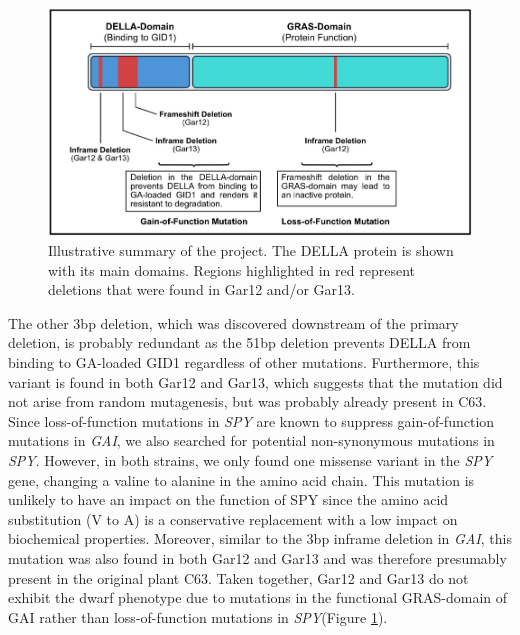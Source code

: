 \documentclass[10pt,a4paper]{article}
\begin{document}
\begin{figure}[H]
	\centering
	\includegraphics[width=0.7\linewidth]{img/DELLAdomains}
	\caption{Illustrative summary of the project. The DELLA protein is shown with its main domains. Regions highlighted in red represent deletions that were found in Gar12 and/or Gar13.}
	\label{fig:delladomains}
\end{figure}



\noindent The other 3bp deletion, which was discovered downstream of the primary deletion, is probably redundant as the 51bp deletion prevents DELLA from binding to GA-loaded GID1 regardless of other mutations. Furthermore, this variant is found in both Gar12 and Gar13, which suggests that the mutation did not arise from random mutagenesis, but was probably already present in C63. Since loss-of-function mutations in \textit{SPY} are known to suppress gain-of-function mutations in \textit{GAI}, we also searched for potential non-synonymous mutations in \textit{SPY}. However, in both strains, we only found one missense variant in the \textit{SPY} gene, changing a valine to alanine in the amino acid chain. This mutation is unlikely to have an impact on the function of SPY since the amino acid substitution (V to A) is a conservative replacement with a low impact on biochemical properties. Moreover, similar to the 3bp inframe deletion in \textit{GAI}, this mutation was also found in both Gar12 and Gar13 and was therefore presumably present in the original plant C63. Taken together, Gar12 and Gar13 do not exhibit the dwarf phenotype due to mutations in the functional GRAS-domain of GAI rather than loss-of-function mutations in \textit{SPY}(Figure \ref{fig:delladomains}).





\newpage
\end{document}
